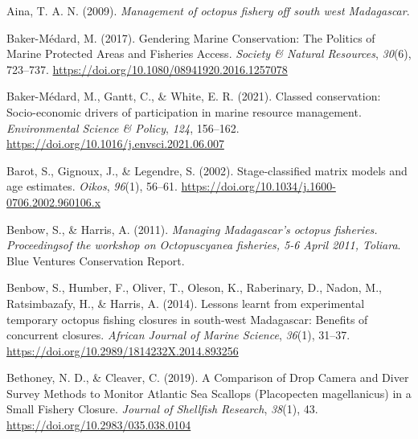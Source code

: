 \documentclass[
]{article}
\newlength{\cslhangindent}
\newlength{\cslentryspacingunit} %
\newenvironment{CSLReferences}[2] %
 {%
  \setlength{\parindent}{0pt}
  \ifodd #1
  \let\oldpar\par
  \def\par{\hangindent=\cslhangindent\oldpar}
  \fi
  \setlength{\parskip}{#2\cslentryspacingunit}
 }%
 {}
\begin{document}
\hypertarget{refs}{}
\begin{CSLReferences}{1}{2}
\leavevmode{}%
Aina, T. A. N. (2009). \emph{Management of octopus fishery off south west {Madagascar}}.

\leavevmode{}%
Baker-Médard, M. (2017). Gendering {Marine Conservation}: {The Politics} of {Marine Protected Areas} and {Fisheries Access}. \emph{Society \& Natural Resources}, \emph{30}(6), 723--737. \url{https://doi.org/10.1080/08941920.2016.1257078}

\leavevmode{}%
Baker-Médard, M., Gantt, C., \& White, E. R. (2021). Classed conservation: {Socio-economic} drivers of participation in marine resource management. \emph{Environmental Science \& Policy}, \emph{124}, 156--162. \url{https://doi.org/10.1016/j.envsci.2021.06.007}

\leavevmode{}%
Barot, S., Gignoux, J., \& Legendre, S. (2002). Stage-classified matrix models and age estimates. \emph{Oikos}, \emph{96}(1), 56--61. \url{https://doi.org/10.1034/j.1600-0706.2002.960106.x}

\leavevmode{}%
Benbow, S., \& Harris, A. (2011). \emph{Managing {Madagascar}'s octopus fisheries. {Proceedingsof} the workshop on {Octopuscyanea} fisheries, 5-6 {April} 2011, {Toliara}}. Blue Ventures Conservation Report.

\leavevmode{}%
Benbow, S., Humber, F., Oliver, T., Oleson, K., Raberinary, D., Nadon, M., Ratsimbazafy, H., \& Harris, A. (2014). Lessons learnt from experimental temporary octopus fishing closures in south-west {Madagascar}: Benefits of concurrent closures. \emph{African Journal of Marine Science}, \emph{36}(1), 31--37. \url{https://doi.org/10.2989/1814232X.2014.893256}

\leavevmode{}%
Bethoney, N. D., \& Cleaver, C. (2019). A {Comparison} of {Drop Camera} and {Diver Survey Methods} to {Monitor Atlantic Sea Scallops} ({Placopecten} magellanicus) in a {Small Fishery Closure}. \emph{Journal of Shellfish Research}, \emph{38}(1), 43. \url{https://doi.org/10.2983/035.038.0104}


\end{CSLReferences}
\end{document}
